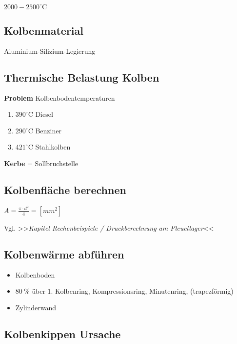 $2000 - 2500^\circ\text{C}$

\subsection{Kolbenmaterial}\label{kolbenmaterial}

Aluminium-Silizium-Legierung

\subsection{Thermische Belastung
Kolben}\label{thermische-belastung-kolben}

\textbf{Problem} Kolbenbodentemperaturen

\begin{enumerate}
\def\labelenumi{(\arabic{enumi})}
\item
  $390^\circ\text{C}$ Diesel
\item
  $290^\circ\text{C}$ Benziner
\item
  $421^\circ\text{C}$ Stahlkolben
\end{enumerate}

\textbf{Kerbe} = Sollbruchstelle

\subsection{Kolbenfläche berechnen}\label{kolbenflaeche-berechnen}

$A = \frac{\pi \cdot d^2}{4} = [mm^2]$

Vgl. >>\emph{Kapitel Rechenbeispiele / Druckberechnung am Pleuellager}<<

\subsection{Kolbenwärme abführen}\label{kolbenwaerme-abfuehren}

\begin{itemize}
\item
  Kolbenboden
\item
  $80~\%$ über 1. Kolbenring, Kompressionsring, Minutenring,
  (trapezförmig)
\item
  Zylinderwand
\end{itemize}

\subsection{Kolbenkippen Ursache}\label{kolbenkippen-ursache}

